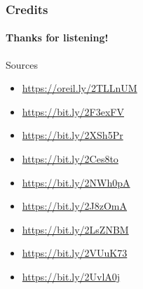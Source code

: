\documentclass[]{beamer}
\begin{document}
\begin{frame}
  \frametitle{Credits}
  \framesubtitle{Thanks for listening!}

  \begin{block}{Sources}
    \begin{itemize}
      \item \url{https://oreil.ly/2TLLnUM}
      \item \url{https://bit.ly/2F3exFV}
      \item \url{https://bit.ly/2XSh5Pr}
      \item \url{https://bit.ly/2Ces8to}
      \item \url{https://bit.ly/2NWh0pA}
      \item \url{https://bit.ly/2J8zOmA}
      \item \url{https://bit.ly/2LsZNBM}
      \item \url{https://bit.ly/2VUuK73}
      \item \url{https://bit.ly/2UvlA0j}
    \end{itemize}
  \end{block}
\end{frame}
\end{document}

